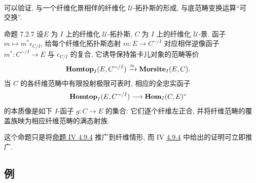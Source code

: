 \setcounter{paragraph}{7}
\paragraph{}

可以验证, 与一个纤维化景相伴的纤维化 $𝒰$-拓扑斯的形成,
与底范畴变换运算“可交换”.

\begin{enonce*}{命题 7.2.7}
设\pageoriginale $E$ 为 $I$ 上的纤维化 $𝒰$-拓扑斯,
$C$ 为 $I$ 上的纤维化 $𝒰$-景.
函子 $m \mapsto m^{\ast} \epsilon_{C/I}$,
给每个纤维化拓扑斯态射 $m : E \to C^{\sim /I}$
对应相伴逆像函子 $m^{\ast} : C^{\sim / I} \to E$ 与 $\epsilon_{C/I}$ 的复合,
它诱导保持笛卡儿对象的范畴等价
$$
\operatorname{\mathbf{Homtop}}_I (E, C^{\sim / I}) \xrightarrow{\approx} \operatorname{\mathbf{Morsite}}_I(E,
C){}.
$$
当 $C$ 的各纤维范畴中有限投射极限可表时,
相应的全忠实函子
$$
\Hhomtop_{I} (E, C^{\sim/ I}) \to \Hhom_{I} (C, E)^{\circ}
$$
的本质像是如下 $I$-函子 $g : C \to E$ 的集合:
它们逐个纤维左正合, 并将纤维范畴的覆盖族映为相应纤维范畴的满态射族.
\end{enonce*}

这个命题只是将\hyperref[IV.prop4.9.4]{命题 IV 4.9.4} 推广到纤维情形,
而 IV \hyperref[IV.prop4.9.4]{4.9.4} 中给出的证明可立即推广.

\subsection{例}

